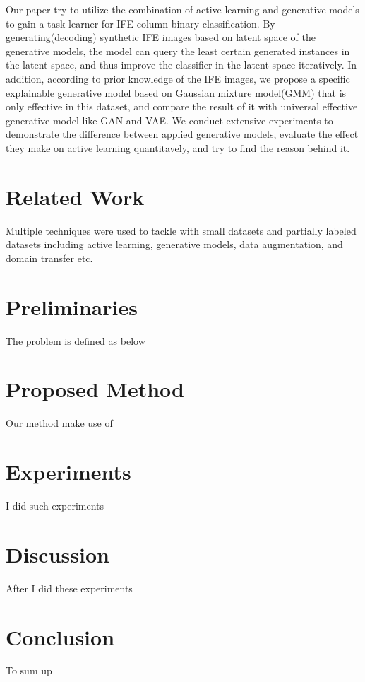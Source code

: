 \documentclass[letterpaper]{article}
\begin{document}
Our paper try to utilize the combination of active learning and generative models to gain a task learner for IFE column binary classification. By generating(decoding) synthetic IFE images based on latent space of the generative models, the model can query the least certain generated instances in the latent space, and thus improve the classifier in the latent space iteratively. In addition, according to prior knowledge of the IFE images, we propose a specific explainable generative model based on Gaussian mixture model(GMM) that is only effective in this dataset, and compare the result of it with universal effective generative model like GAN and VAE. We conduct extensive experiments to demonstrate the difference between applied generative models, evaluate the effect they make on active learning quantitavely, and try to find the reason behind it.%


\section{Related Work}
Multiple techniques were used to tackle with small datasets and partially labeled datasets including active learning\cite{settles2009active}, generative models\cite{goodfellow2014generative}\cite{kingma2013auto}, data augmentation\cite{tanner1987calculation}, and domain transfer\cite{pan2009survey} etc. \cite{Zhu2017GenerativeAA}

\section{Preliminaries}
The problem is defined as below

\section{Proposed Method}
Our method make use of

\section{Experiments}
I did such experiments

\section{Discussion}
After I did these experiments

\section{Conclusion}
To sum up



\end{document}
